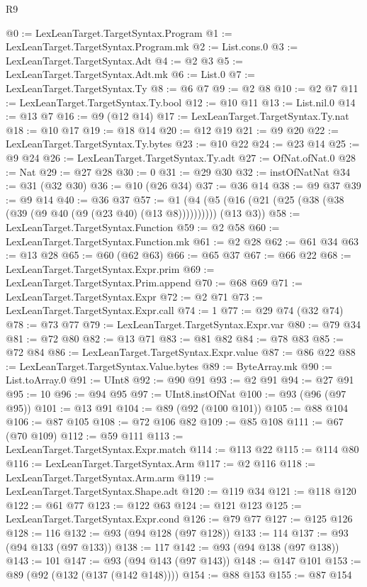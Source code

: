 \begin{lexlean}{R9}
\begin{coremodule}
@0 := LexLeanTarget.TargetSyntax.Program
@1 := LexLeanTarget.TargetSyntax.Program.mk
@2 := List.cons.{0}
@3 := LexLeanTarget.TargetSyntax.Adt
@4 := @2 @3
@5 := LexLeanTarget.TargetSyntax.Adt.mk
@6 := List.{0}
@7 := LexLeanTarget.TargetSyntax.Ty
@8 := @6 @7
@9 := @2 @8
@10 := @2 @7
@11 := LexLeanTarget.TargetSyntax.Ty.bool
@12 := @10 @11
@13 := List.nil.{0}
@14 := @13 @7
@16 := @9 (@12 @14)
@17 := LexLeanTarget.TargetSyntax.Ty.nat
@18 := @10 @17
@19 := @18 @14
@20 := @12 @19
@21 := @9 @20
@22 := LexLeanTarget.TargetSyntax.Ty.bytes
@23 := @10 @22
@24 := @23 @14
@25 := @9 @24
@26 := LexLeanTarget.TargetSyntax.Ty.adt
@27 := OfNat.ofNat.{0}
@28 := Nat
@29 := @27 @28
@30 := 0
@31 := @29 @30
@32 := instOfNatNat
@34 := @31 (@32 @30)
@36 := @10 (@26 @34)
@37 := @36 @14
@38 := @9 @37
@39 := @9 @14
@40 := @36 @37
@57 := @1 (@4 (@5 (@16 (@21 (@25 (@38 (@38 (@39 (@9 @40 (@9 (@23 @40) (@13 @8)))))))))) (@13 @3))
@58 := LexLeanTarget.TargetSyntax.Function
@59 := @2 @58
@60 := LexLeanTarget.TargetSyntax.Function.mk
@61 := @2 @28
@62 := @61 @34
@63 := @13 @28
@65 := @60 (@62 @63)
@66 := @65 @37
@67 := @66 @22
@68 := LexLeanTarget.TargetSyntax.Expr.prim
@69 := LexLeanTarget.TargetSyntax.Prim.append
@70 := @68 @69
@71 := LexLeanTarget.TargetSyntax.Expr
@72 := @2 @71
@73 := LexLeanTarget.TargetSyntax.Expr.call
@74 := 1
@77 := @29 @74 (@32 @74)
@78 := @73 @77
@79 := LexLeanTarget.TargetSyntax.Expr.var
@80 := @79 @34
@81 := @72 @80
@82 := @13 @71
@83 := @81 @82
@84 := @78 @83
@85 := @72 @84
@86 := LexLeanTarget.TargetSyntax.Expr.value
@87 := @86 @22
@88 := LexLeanTarget.TargetSyntax.Value.bytes
@89 := ByteArray.mk
@90 := List.toArray.{0}
@91 := UInt8
@92 := @90 @91
@93 := @2 @91
@94 := @27 @91
@95 := 10
@96 := @94 @95
@97 := UInt8.instOfNat
@100 := @93 (@96 (@97 @95))
@101 := @13 @91
@104 := @89 (@92 (@100 @101))
@105 := @88 @104
@106 := @87 @105
@108 := @72 @106 @82
@109 := @85 @108
@111 := @67 (@70 @109)
@112 := @59 @111
@113 := LexLeanTarget.TargetSyntax.Expr.match
@114 := @113 @22
@115 := @114 @80
@116 := LexLeanTarget.TargetSyntax.Arm
@117 := @2 @116
@118 := LexLeanTarget.TargetSyntax.Arm.arm
@119 := LexLeanTarget.TargetSyntax.Shape.adt
@120 := @119 @34
@121 := @118 @120
@122 := @61 @77
@123 := @122 @63
@124 := @121 @123
@125 := LexLeanTarget.TargetSyntax.Expr.cond
@126 := @79 @77
@127 := @125 @126
@128 := 116
@132 := @93 (@94 @128 (@97 @128))
@133 := 114
@137 := @93 (@94 @133 (@97 @133))
@138 := 117
@142 := @93 (@94 @138 (@97 @138))
@143 := 101
@147 := @93 (@94 @143 (@97 @143))
@148 := @147 @101
@153 := @89 (@92 (@132 (@137 (@142 @148))))
@154 := @88 @153
@155 := @87 @154

\end{coremodule}
\end{lexlean}
